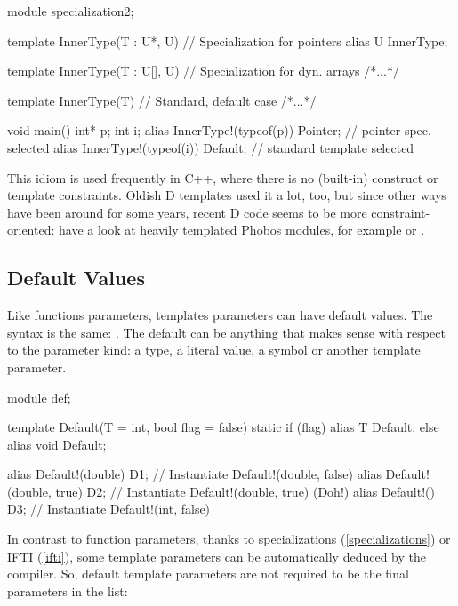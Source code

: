 \begin{dcode}
module specialization2;

template InnerType(T : U*, U) // Specialization for pointers
{
    alias U InnerType;
}

template InnerType(T : U[], U) // Specialization for dyn. arrays
{ /*...*/ }

template InnerType(T) // Standard, default case
{ /*...*/ }

void main()
{
    int* p;
    int i; 
    alias InnerType!(typeof(p)) Pointer; // pointer spec. selected
    alias InnerType!(typeof(i)) Default; // standard template selected
}
\end{dcode}

This idiom is used frequently in C++, where there is no (built-in)  construct or template constraints. Oldish D templates used it a lot, too, but since other ways have been around for some years, recent D code seems to be more constraint-oriented: have a look at heavily templated Phobos modules, for example  or .


\subsection{Default Values}\label{default}

Like functions parameters, templates parameters can have default values. The syntax is the same: . The default can be anything that makes sense with respect to the parameter kind: a type, a literal value, a symbol or another template parameter.

\begin{dcode}
module def;

template Default(T = int, bool flag = false)
{
    static if (flag)
        alias T Default;
    else
        alias void Default;
}

alias Default!(double) D1;       // Instantiate Default!(double, false)
alias Default!(double, true) D2; // Instantiate Default!(double, true) (Doh!)
alias Default!() D3;             // Instantiate Default!(int, false)
\end{dcode}

In contrast to function parameters, thanks to specializations (\ref{specializations}) or IFTI (\ref{ifti}), some template parameters can be automatically deduced by the compiler. So, default template parameters are not required to be the final parameters in the list:

